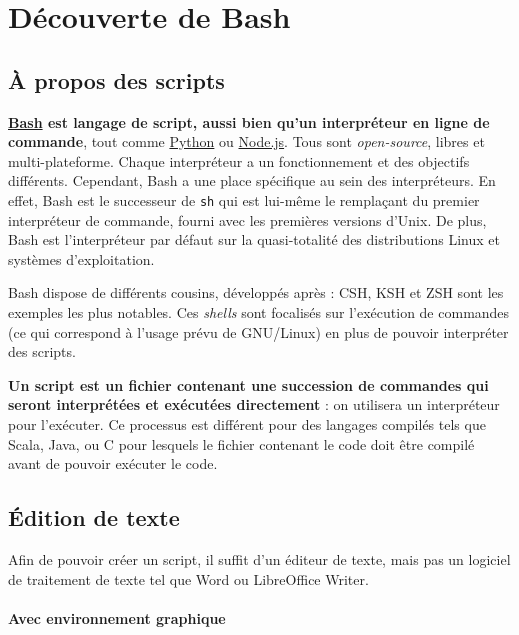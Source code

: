 \section{Découverte de Bash}
\vspace{-4mm}
\subsection{À propos des scripts}
\vspace{-2mm}
\textbf{\href{https://www.gnu.org/software/bash}{Bash} est langage de script, aussi bien qu'un interpréteur en ligne de commande}, tout comme \href{https://www.python.org}{Python} ou \href{https://nodejs.org}{Node.js}. Tous sont \textit{open-source}, libres et multi-plateforme. Chaque interpréteur a un fonctionnement et des objectifs différents. Cependant, Bash a une place spécifique au sein des interpréteurs. En effet, Bash est le successeur de \texttt{sh} qui est lui-même le remplaçant du premier interpréteur de commande, fourni avec les premières versions d'Unix. De plus, Bash est l'interpréteur par défaut sur la quasi-totalité des distributions Linux et systèmes d'exploitation.

Bash dispose de différents cousins, développés après : CSH, KSH et ZSH sont les exemples les plus notables. Ces \textit{shells} sont focalisés sur l'exécution de commandes (ce qui correspond à l'usage prévu de GNU/Linux) en plus de pouvoir interpréter des scripts.

\textbf{Un script est un fichier contenant une succession de commandes qui seront interprétées et exécutées directement} : on utilisera un interpréteur pour l’exécuter. Ce processus est différent pour des langages compilés tels que Scala, Java, ou C pour lesquels le fichier contenant le code doit être compilé avant de pouvoir exécuter le code.

\vspace{-4mm}
\subsection{Édition de texte}
\vspace{-2mm}
Afin de pouvoir créer un script, il suffit d'un éditeur de texte, mais pas un logiciel de traitement de texte tel que Word ou LibreOffice Writer.

\paragraph{Avec environnement graphique}


